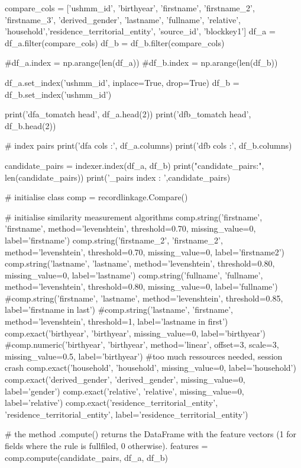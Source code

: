 \documentclass[a4paper,12pt,twoside]{book}
\begin{document}
\begin{python}
  compare_cols = ['ushmm_id', 'birthyear', 'firstname', 'firstname_2', 'firstname_3', 'derived_gender', 'lastname', 'fullname', 'relative', 'household','residence_territorial_entity', 'source_id', 'blockkey1']
  df_a = df_a.filter(compare_cols)
  df_b = df_b.filter(compare_cols)

  #df_a.index = np.arange(len(df_a))
  #df_b.index = np.arange(len(df_b))

  df_a.set_index('ushmm_id', inplace=True, drop=True)
  df_b = df_b.set_index('ushmm_id')

  print('\n dfa_tomatch head\n', df_a.head(2))
  print('\n dfb_tomatch head\n', df_b.head(2))

  # index pairs
  print('\n dfa cols :\n', df_a.columns)
  print('\n dfb cols :\n', df_b.columns)

  candidate_pairs = indexer.index(df_a, df_b)
  print("candidate_pairs:", len(candidate_pairs))
  print('\ncandidate_pairs index : \n',candidate_pairs)

  
  # initialise class
  comp = recordlinkage.Compare()

  # initialise similarity measurement algorithms
  comp.string('firstname', 'firstname', method='levenshtein', threshold=0.70, missing_value=0, label='firstname')
  comp.string('firstname_2', 'firstname_2', method='levenshtein', threshold=0.70, missing_value=0, label='firstname2')
  comp.string('lastname', 'lastname', method='levenshtein', threshold=0.80, missing_value=0, label='lastname')
  comp.string('fullname', 'fullname', method='levenshtein', threshold=0.80, missing_value=0, label='fullname')
  #comp.string('firstname', 'lastname', method='levenshtein', threshold=0.85, label='firstname in last')
  #comp.string('lastname', 'firstname', method='levenshtein', threshold=1, label='lastname in first')
  comp.exact('birthyear', 'birthyear',  missing_value=0, label='birthyear')
  #comp.numeric('birthyear', 'birthyear', method='linear', offset=3, scale=3, missing_value=0.5, label='birthyear') #too much ressources needed, session crash
  comp.exact('household', 'household',  missing_value=0, label='household')
  comp.exact('derived_gender', 'derived_gender',  missing_value=0, label='gender')
  comp.exact('relative', 'relative', missing_value=0, label='relative')
  comp.exact('residence_territorial_entity', 'residence_territorial_entity', label='residence_territorial_entity')

  # the method .compute() returns the DataFrame with the feature vectors (1 for fields where the rule is fullfiled, 0 otherwise).
  features = comp.compute(candidate_pairs, df_a, df_b)
  

\end{python}
\end{document}
